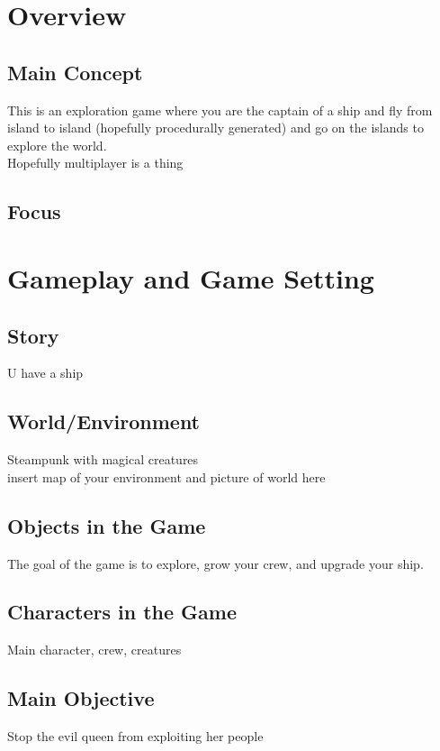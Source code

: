 \documentclass[a4paper]{scrreprt}
\begin{document}


\chapter{Overview}

\section{Main Concept}
This is an exploration game where you are the captain of a ship and fly from island to island (hopefully procedurally generated) and go on the islands to explore the world.
\\
Hopefully multiplayer is a thing

\section{Focus}




\chapter{Gameplay and Game Setting}


\section{Story}
U have a ship

\section{World/Environment}
Steampunk with magical creatures\\
insert map of your environment and picture of world here

\section{Objects in the Game}
The goal of the game is to explore, grow your crew, and upgrade your ship.

\section{Characters in the Game}
Main character, crew, creatures

\section{Main Objective}
Stop the evil queen from exploiting her people
\end{document}
